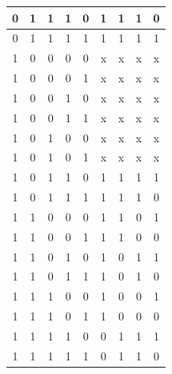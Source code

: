 \documentclass[a4paper,14pt]{article}
\begin{document}
\begin{table}[H]
\begin{tabular}{|c|c|c|c|c|c|c|c|c|}
		0     & 1     & 1     & 1     & 0     & 1               & 1               & 1               & 0               \\ \hline
		0     & 1     & 1     & 1     & 1     & 1               & 1               & 1               & 1               \\ \hline
		1     & 0     & 0     & 0     & 0     & x               & x               & x               & x               \\ \hline
		1     & 0     & 0     & 0     & 1     & x               & x               & x               & x               \\ \hline
		1     & 0     & 0     & 1     & 0     & x               & x               & x               & x               \\ \hline
		1     & 0     & 0     & 1     & 1     & x               & x               & x               & x               \\ \hline
		1     & 0     & 1     & 0     & 0     & x               & x               & x               & x               \\ \hline
		1     & 0     & 1     & 0     & 1     & x               & x               & x               & x               \\ \hline
		1     & 0     & 1     & 1     & 0     & 1               & 1               & 1               & 1               \\ \hline
		1     & 0     & 1     & 1     & 1     & 1               & 1               & 1               & 0               \\ \hline
		1     & 1     & 0     & 0     & 0     & 1               & 1               & 0               & 1               \\ \hline
		1     & 1     & 0     & 0     & 1     & 1               & 1               & 0               & 0               \\ \hline
		1     & 1     & 0     & 1     & 0     & 1               & 0               & 1               & 1               \\ \hline
		1     & 1     & 0     & 1     & 1     & 1               & 0               & 1               & 0               \\ \hline
		1     & 1     & 1     & 0     & 0     & 1               & 0               & 0               & 1               \\ \hline
		1     & 1     & 1     & 0     & 1     & 1               & 0               & 0               & 0               \\ \hline
		1     & 1     & 1     & 1     & 0     & 0               & 1               & 1               & 1               \\ \hline
		1     & 1     & 1     & 1     & 1     & 0               & 1               & 1               & 0               \\ \hline
	\end{tabular}
\end{table}
\end{document}
